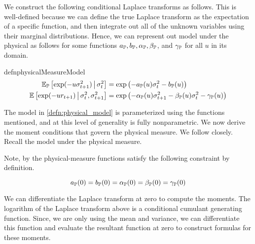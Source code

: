 \documentclass[11pt, letterpaper, twoside, final]{article}
\begin{document}
We construct the following conditional Laplace transforms as follows.
This is well-defined because we can define the true Laplace transform as the expectation of a specific function,
and then integrate out all of the unknown variables using their marginal distributions.
Hence, we can represent out model under the physical  as follows for some functions $a_{\mathbb{P}}, b_{\mathbb{P}},
\alpha_{\mathbb{P}}, \beta_{\mathbb{P}}$, and $\gamma_{\mathbb{P}}$ for all $u$ in its domain.

\begin{restatable}{defn}{physicalMeasureModel}
    \label{defn:physical_model}
    \begin{align}
        \operatorname{\mathbb{E}}_{\mathbb{P}} \left[\exp(-u \sigma^2_{t+1}) \,\middle\vert\, \sigma^2_t \right] &= \exp\left( - a_{\mathbb{P}}(u) \sigma^2_t -
        b_{\mathbb{P}}(u) \right) \\
        \operatorname{\mathbb{E}}\left[\exp(-u r_{t+1}) \,\middle\vert\, \sigma^2_t,  \sigma^2_{t+1}\right] &= \exp\left(- \alpha_{\mathbb{P}}(u)
        \sigma^2_{t+1} - \beta_{\mathbb{P}}(u)\sigma^2_t - \gamma_{\mathbb{P}}(u) \right) 
    \end{align}
\end{restatable}

The model in \cref{defn:physical_model} is parameterized using the functions mentioned, and at this level of
generality is fully nonparametric. 
We now derive the moment conditions that govern the physical measure. 
We follow \textcite{khrapov2016affine} closely.
Recall the model under the physical measure. 


Note, by the physical-measure functions satisfy the following constraint by definition.

\begin{equation}
    a_{\mathbb{P}}(0) = b_{\mathbb{P}}(0) = \alpha_{\mathbb{P}}(0) = \beta_{\mathbb{P}}(0) = \gamma_{\mathbb{P}}(0) 
\end{equation}

We can differentiate the Laplace transform at zero to compute the moments.
The logarithm of the Laplace transform above is a conditional cumulant generating function.
Since, we are only using the mean and variance, we can differentiate this function  and evaluate the
resultant function at zero to construct formulas for these moments.
\end{document}
